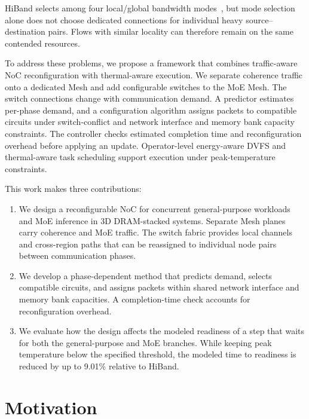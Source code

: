 \documentclass[conference,10pt]{IEEEtran}
\begin{document}
HiBand selects among four local/global bandwidth modes~\cite{wang2026hiband},
but mode selection alone does not choose dedicated connections for
individual heavy source--destination pairs. Flows with similar locality
can therefore remain on the same contended resources.

To address these problems, we propose a framework that combines
traffic-aware NoC reconfiguration with thermal-aware execution.
We separate coherence traffic onto a dedicated Mesh and add configurable
switches to the MoE Mesh. The switch connections change with communication
demand. A predictor estimates
per-phase demand, and a configuration algorithm assigns packets to compatible
circuits under switch-conflict and network interface and memory bank capacity
constraints. The controller checks estimated completion time and
reconfiguration overhead before applying an update. Operator-level
energy-aware DVFS and thermal-aware task scheduling support execution under
peak-temperature constraints.

This work makes three contributions:
\begin{enumerate}
  \item We design a reconfigurable NoC for concurrent general-purpose
  workloads and MoE inference in 3D DRAM-stacked systems. Separate Mesh
  planes carry coherence and MoE traffic. The switch fabric
  provides local channels and cross-region paths that can be reassigned to
  individual node pairs between communication phases.

  \item We develop a phase-dependent method that predicts demand, selects
  compatible circuits, and assigns packets within shared network interface
  and memory bank capacities. A completion-time check accounts for
  reconfiguration overhead.

  \item We evaluate how the design affects the modeled readiness of a step
  that waits for both the general-purpose and MoE branches. While keeping peak temperature below the specified threshold,
  the modeled time to readiness is reduced by up to 9.01\% relative to HiBand.
\end{enumerate}

\setlength{\textfloatsep}{12pt}
\setlength{\floatsep}{10pt}

\section{Motivation}
\label{sec:motivation}
\end{document}
